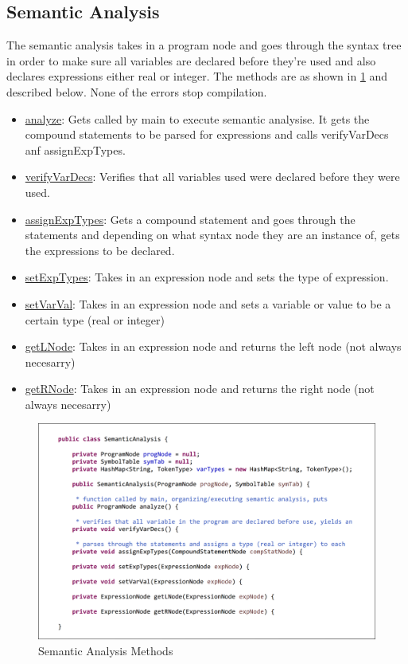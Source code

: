 \documentclass[english]{article}
\begin{document}
\subsection{Semantic Analysis}


The semantic analysis takes in a program node and goes through the syntax tree in order to make sure all variables are declared before they're used and also declares expressions either real or integer. The methods are as shown in \ref{Semantic} and described below. None of the errors stop compilation.

\begin{itemize}
\item
\underline{analyze}: Gets called by main to execute semantic analysise. It gets the compound statements  to be parsed for expressions and calls verifyVarDecs anf assignExpTypes. 
\item
\underline{verifyVarDecs}: Verifies that all variables used were declared before they were used.
\item
\underline{assignExpTypes}:  Gets a compound statement and goes through the statements and depending on what syntax node they are an instance of, gets the expressions to be declared.
\item
\underline{setExpTypes}: Takes in an expression node and sets the type of expression.
\item
\underline{setVarVal}: Takes in an expression node and sets a variable or value to be a certain type (real or integer)
\item
\underline{getLNode}: Takes in an expression node and returns the left node (not always necesarry)
\item
\underline{getRNode}: Takes in an expression node and returns the right node (not always necesarry)
\end{itemize}


\begin{figure}
\begin{center}
\includegraphics[width=1.1\textwidth]{semantic.PNG}
\end{center}
\caption{\label{Semantic}Semantic Analysis Methods}
\end{figure}
\end{document}

